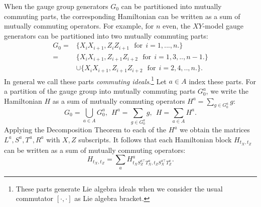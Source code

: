 \documentclass[a4paper,onecolumn,11pt,unpublished]{quantumarticle}
\def\smbox#1{\ \ \mbox{#1}\ \ }
\begin{document}
When the gauge group generators $G_0$ can be
partitioned into mutually commuting parts, the
corresponding Hamiltonian can be written as a sum
of mutually commuting operators.
For example,
for $n$ even, the $XY$-model gauge generators can
be partitioned into two mutually commuting parts:
\begin{align*}
G_0 = &\{X_i X_{i+1}, Z_i Z_{i+1}\  \smbox{for} i=1,...,n. \} \\
    = &\{X_i X_{i+1}, Z_{i+1} Z_{i+2}\ \smbox{for}  i=1,3,..,n-1. \}\\
    & \cup \{X_i X_{i+1}, Z_{i+1} Z_{i+2}\ \smbox{for}  i=2,4,..,n. \}.
\end{align*}
In general we call these parts \emph{commuting ideals}.\footnote{
These parts generate Lie algebra ideals when we consider 
the usual commutator $[\cdot,\cdot]$ as Lie algebra bracket.}
Let $a\in A$ index these parts. 
For a partition of the gauge group into mutually commuting parts $G_0^{a}$,
we write the Hamiltonian $H$ as a sum of mutually commuting
operators $H^a = \sum_{g\in G_0^{a}} g:$
$$
    G_0 = \bigcup_{a\in A} G_0^{a},\ \  
    H^a = \sum_{g\in G_0^{a}} g,\ \  
    H = \sum_{a\in A} H^a.
$$
%
Applying the Decomposition Theorem to each of the
$H^a$ we obtain the matrices $L^a, S^a, T^a, R^a$ with $X,Z$ subscripts.
It follows that
each Hamiltonian block $ H_{t_X,t_Z} $
can be written as a sum of mutually commuting operators:
$$
    H_{t_X,t_Z} = \sum_a H^a_{t_X S_Z^{a\top} T_X^a, t_Z S_X^{a\top} T_Z^a}.
$$
\end{document}
